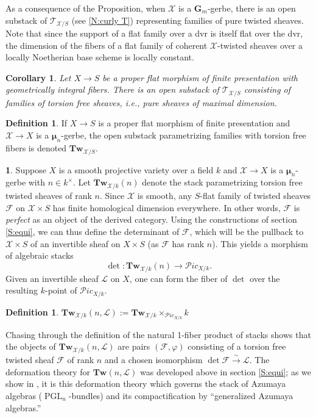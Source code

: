 \documentclass[11pt]{amsart}
\newcommand{\field}[1]{\mathbf #1}
\newcommand{\ms}[1]{\mathscr #1}
\newcommand{\simto}{\stackrel{\sim}{\to}}
\renewcommand{\phi}{\varphi}
\newcommand{\m}{\boldsymbol{\mu}}
\newcommand{\G}{\field G} %
\newcommand{\PGL}{\operatorname{PGL}}
\renewcommand{\[}{[\!\hspace{0.03em}[}
\renewcommand{\]}{]\!\hspace{0.03em}]}
\renewcommand{\(}{(\!\hspace{0.03em}(}
\renewcommand{\)}{)\!\hspace{0.03em})}
\newcommand{\Tw}{\mathbf{Tw}}
\newtheorem{cor}[lem]{Corollary}
\theoremstyle{definition}
\newtheorem{defn}[lem]{Definition}
\newtheorem{para}[lem]{\indent}
\theoremstyle{remark}
\begin{document}
As a consequence of the Proposition, when $\ms X$ is a $\G_{m}$-gerbe, there is an open substack of 
$\ms T_{\ms X/S}$ (see \ref{N:curly T}) representing families of pure twisted sheaves.  Note 
that since the support of a flat family over a dvr is itself flat 
over the dvr, the dimension of the 
fibers of a flat family of coherent $\ms X$-twisted sheaves over a locally Noetherian base scheme is 
locally constant.
\begin{cor} Let $X\to S$ be a proper flat morphism of finite presentation 
with geometrically integral fibers.  There is an open substack of $\ms 
T_{\ms X/S}$ consisting of 
families of torsion free sheaves, i.e., pure sheaves of maximal 
dimension.
\end{cor}
\begin{defn} If $X\to S$ is a proper flat morphism of finite 
presentation and $\ms X\to X$ is a $\m_{n}$-gerbe, the open substack 
parametrizing families with torsion free fibers is denoted $\Tw_{\ms 
X/S}$.
\end{defn}

\begin{para} Suppose $X$ is a smooth projective variety over a field 
$k$ and $\ms X\to X$ is a $\m_{n}$-gerbe with $n\in k^{\times}$.  
Let $\Tw_{\ms X/k}(n)$ denote the stack parametrizing torsion free 
twisted sheaves of rank $n$.  Since $\ms X$ is smooth, any $S$-flat 
family of twisted sheaves $\ms F$ on $\ms X\times S$ has finite 
homological dimension everywhere.  In other words, $\ms F$ is 
\emph{perfect\/} as an object of the derived category.  Using the 
constructions of section \ref{S:equi}, we can thus define the 
determinant of $\ms F$,  which will be the pullback to $\ms 
X\times S$ of an invertible sheaf 
on $X\times S$ (as $\ms F$ has rank $n$).  This yields a morphism of algebraic stacks
$$\det:\Tw_{\ms X/k}(n)\to\ms Pic_{X/k}.$$
Given an invertible sheaf $\ms L$ on $X$, one can form the fiber of 
$\det$ over the resulting $k$-point of $\ms Pic_{X/k}$.
\end{para}
\begin{defn} $\Tw_{\ms X/k}(n,\ms L):=\Tw_{\ms X/k}\times_{\ms 
Pic_{X/k}}k$
\end{defn}
Chasing through the definition of the natural 1-fiber product of 
stacks shows that the objects of $\Tw_{\ms X/k}(n,\ms L)$ are pairs 
$(\ms F,\phi)$ consisting of a torsion free twisted sheaf $\ms F$ of 
rank $n$ and a chosen isomorphism $\det\ms F\simto\ms L$.  
The deformation theory for $\Tw(n,\ms L)$ was 
developed above in section \ref{S:equi}; as we show in 
\cite{pgl-bundles}, it is this deformation theory which governs the 
stack of Azumaya algebras ($\PGL_{n}$-bundles) and its 
compactification by ``generalized Azumaya algebras.''
\end{document}
